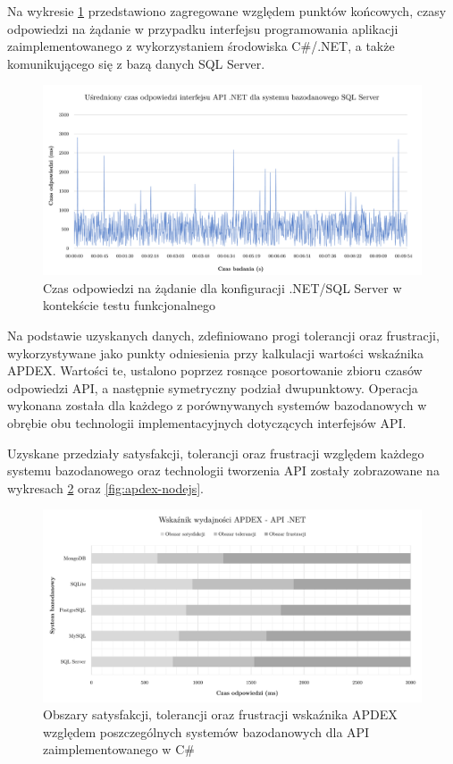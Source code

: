 Na wykresie \ref{fig:wykres-testy-funkcjonalne-dotnet} przedstawiono zagregowane względem punktów końcowych, czasy odpowiedzi na żądanie w przypadku interfejsu programowania aplikacji zaimplementowanego z wykorzystaniem środowiska C\#/.NET, a także komunikującego się z bazą danych SQL Server.

\begin{figure}[ht]
    \centering
     \includegraphics[width=\linewidth]{rys05/testy-funkcjonalne-dotnet.pdf}
    \caption{Czas odpowiedzi na żądanie dla konfiguracji .NET/SQL Server w kontekście testu funkcjonalnego}
    \label{fig:wykres-testy-funkcjonalne-dotnet}
\end{figure}

Na podstawie uzyskanych danych, zdefiniowano progi tolerancji oraz frustracji, wykorzystywane jako punkty odniesienia przy kalkulacji wartości wskaźnika APDEX. Wartości te, ustalono poprzez rosnące posortowanie zbioru czasów odpowiedzi API, a następnie symetryczny podział dwupunktowy. Operacja wykonana została dla każdego z porównywanych systemów bazodanowych w obrębie obu technologii implementacyjnych dotyczących interfejsów API.

Uzyskane przedziały satysfakcji, tolerancji oraz frustracji względem każdego systemu bazodanowego oraz technologii tworzenia API zostały zobrazowane na wykresach \ref{fig:apdex-dotnet} oraz \ref{fig:apdex-nodejs}.

\begin{figure}[ht]
    \centering
     \includegraphics[width=\linewidth]{rys05/apdex-dotnet.pdf}
    \caption{Obszary satysfakcji, tolerancji oraz frustracji wskaźnika APDEX względem poszczególnych systemów bazodanowych dla API zaimplementowanego w C\#}
    \label{fig:apdex-dotnet}
\end{figure}

